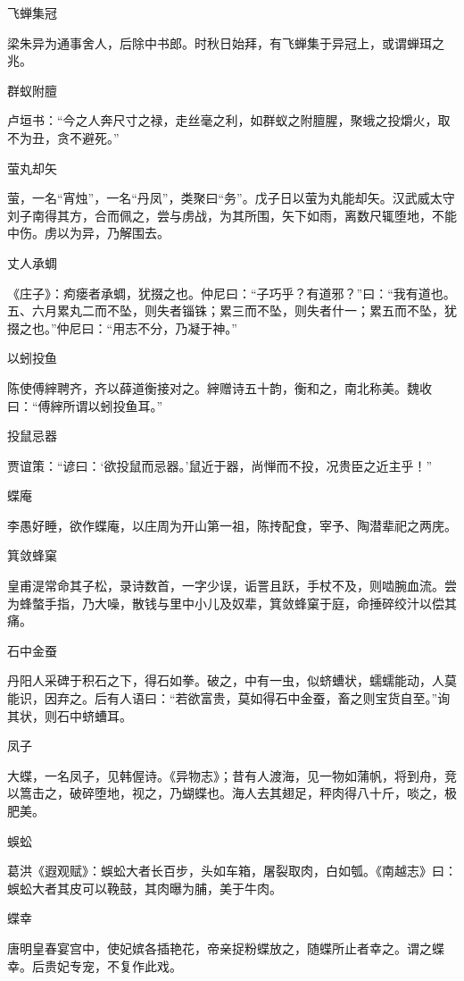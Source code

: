 \documentclass[a4paper,12pt,UTF8,twoside]{ctexbook}
\begin{document}
    飞蝉集冠
    
    梁朱异为通事舍人，后除中书郎。时秋日始拜，有飞蝉集于异冠上，或谓蝉珥之兆。
    
    群蚁附膻
    
    卢垣书：“今之人奔尺寸之禄，走丝毫之利，如群蚁之附膻腥，聚蛾之投爝火，取不为丑，贪不避死。”
    
    萤丸却矢
    
    萤，一名“宵烛”，一名“丹凤”，类聚曰“务”。戊子日以萤为丸能却矢。汉武威太守刘子南得其方，合而佩之，尝与虏战，为其所围，矢下如雨，离数尺辄堕地，不能中伤。虏以为异，乃解围去。
    
    丈人承蜩
    
    《庄子》：痀瘘者承蜩，犹掇之也。仲尼曰：“子巧乎？有道邪？”曰：“我有道也。五、六月累丸二而不坠，则失者锱铢；累三而不坠，则失者什一；累五而不坠，犹掇之也。”仲尼曰：“用志不分，乃凝于神。”
    
    以蚓投鱼
    
    陈使傅縡聘齐，齐以薛道衡接对之。縡赠诗五十韵，衡和之，南北称美。魏收曰：“傅縡所谓以蚓投鱼耳。”
    
    投鼠忌器
    
    贾谊策：“谚曰：‘欲投鼠而忌器。’鼠近于器，尚惮而不投，况贵臣之近主乎！”
    
    蝶庵
    
    李愚好睡，欲作蝶庵，以庄周为开山第一祖，陈抟配食，宰予、陶潜辈祀之两庑。
    
    箕敛蜂窠
    
    皇甫湜常命其子松，录诗数首，一字少误，诟詈且跃，手杖不及，则啮腕血流。尝为蜂螫手指，乃大噪，散钱与里中小儿及奴辈，箕敛蜂窠于庭，命捶碎绞汁以偿其痛。
    
    石中金蚕
    
    丹阳人采碑于积石之下，得石如拳。破之，中有一虫，似蛴螬状，蠕蠕能动，人莫能识，因弃之。后有人语曰：“若欲富贵，莫如得石中金蚕，畜之则宝货自至。”询其状，则石中蛴螬耳。
    
    凤子
    
    大蝶，一名凤子，见韩偓诗。《异物志》；昔有人渡海，见一物如蒲帆，将到舟，竞以篙击之，破碎堕地，视之，乃蝴蝶也。海人去其翅足，秤肉得八十斤，啖之，极肥美。
    
    蜈蚣
    
    葛洪《遐观赋》：蜈蚣大者长百步，头如车箱，屠裂取肉，白如瓠。《南越志》曰：蜈蚣大者其皮可以鞔鼓，其肉曝为脯，美于牛肉。
    
    蝶幸
    
    唐明皇春宴宫中，使妃嫔各插艳花，帝亲捉粉蝶放之，随蝶所止者幸之。谓之蝶幸。后贵妃专宠，不复作此戏。
    
\end{document}

